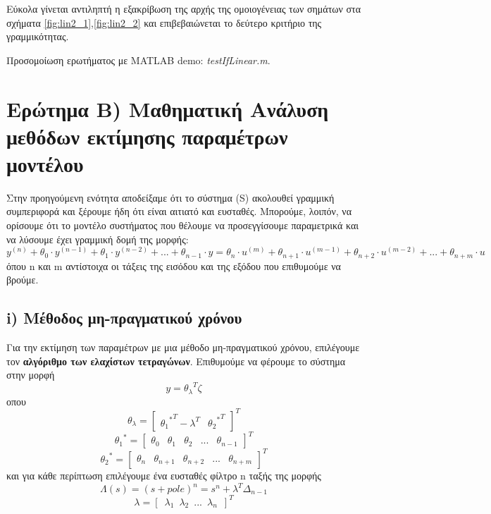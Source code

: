 \documentclass{article}
\begin{document}
\begin{itemize}
    Εύκολα γίνεται αντιληπτή η εξακρίβωση της αρχής της ομοιογένειας των σημάτων στα σχήματα \ref{fig:lin2_1},\ref{fig:lin2_2} και επιβεβαιώνεται το δεύτερο κριτήριο της γραμμικότητας.

\end{itemize}

Προσομοίωση ερωτήματος με MATLAB demo: \textit{testIfLinear.m}.




\section{Ερώτημα Β) Μαθηματική Ανάλυση μεθόδων εκτίμησης παραμέτρων μοντέλου}

Στην προηγούμενη ενότητα αποδείξαμε ότι το σύστημα (S) ακολουθεί γραμμική συμπεριφορά και ξέρουμε ήδη ότι είναι αιτιατό και ευσταθές. Μπορούμε, λοιπόν, να ορίσουμε ότι το μοντέλο συστήματος που θέλουμε να προσεγγίσουμε παραμετρικά και να λύσουμε έχει γραμμική δομή της μορφής: 
\begin{equation*}
y^{(n)} + θ_0 \cdot y^{(n-1)} + θ_1 \cdot  y^{(n-2)} + ... + θ_{n-1} \cdot  y =  θ_n \cdot u^{(m)} + θ_{n+1} \cdot u^{(m-1)} + θ_{n+2} \cdot u^{(m-2)} + ... +  θ_{n+m} \cdot u 
\end{equation*}
όπου n και m αντίστοιχα οι τάξεις της εισόδου και της εξόδου που επιθυμούμε να βρούμε.

\subsection{i) Μέθοδος μη-πραγματικού χρόνου}

Για την εκτίμηση των παραμέτρων με μια μέθοδο μη-πραγματικού χρόνου, επιλέγουμε τον \textbf{αλγόριθμο των ελαχίστων τετραγώνων}. Επιθυμούμε να φέρουμε το σύστημα στην μορφή
\begin{equation*}
y = {θ_λ}^{\!T}ζ
\end{equation*}
οπου 
\begin{equation*}
{θ_λ} = \begin{bmatrix}
    {{θ_1}^*}^{\!T} - {λ}^{\!T} & {{θ_2}^*}^{\!T}   
     
  \end{bmatrix}^{\!T}
\end{equation*}
\[
{θ_1}^* = \begin{bmatrix}
    θ_0 & θ_1 & θ_2 & ... & θ_{n-1}  
     
  \end{bmatrix}^{\!T}
\]
\[
{θ_2}^* = \begin{bmatrix}
    θ_{n} & θ_{n+1} & θ_{n+2} & ... & θ_{n+m}   
     
  \end{bmatrix}^{\!T}
\]
και για κάθε περίπτωση επιλέγουμε ένα ευσταθές φίλτρο n ταξής της μορφής
\begin{equation*}
Λ(s) = (s + pole)^n = s^n + λ^{Τ} Δ_{n-1}
\end{equation*}
\begin{equation*}
λ = [\enspace λ_1 \enspace λ_2 \enspace ... \enspace λ_n \enspace ] ^{Τ}
\end{equation*}
\end{document}
